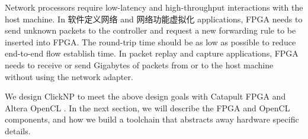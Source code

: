 { Network processors require low-latency and high-throughput interactions with the host machine. In 软件定义网络 and 网络功能虚拟化 applications, FPGA needs to send unknown packets to the controller and request a new forwarding rule to be inserted into FPGA. The round-trip time should be as low as possible to reduce end-to-end flow establish time. In packet replay and capture applications, FPGA needs to receive or send Gigabytes of packets from or to the host machine without using the network adapter.

We design ClickNP to meet the above design goals with Catapult FPGA \cite{putnam2014reconfigurable} and Altera OpenCL \cite{singh2011implementing}. In the next section, we will describe the FPGA and OpenCL components, and how we build a toolchain that abstracts away hardware specific details.
}

